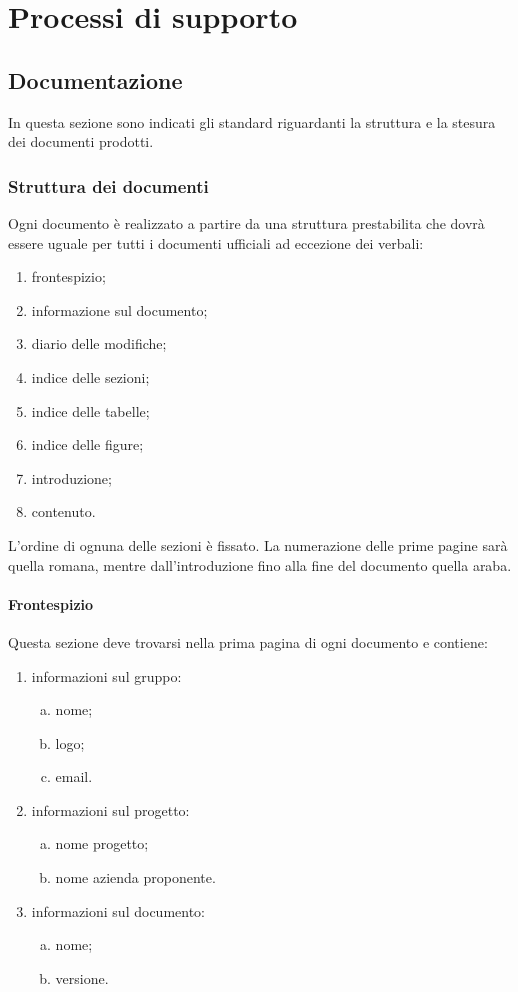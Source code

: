 \documentclass[../NormeProgetto.tex]{subfiles}
\begin{document}
\section{Processi di supporto}
\subsection{Documentazione}
In questa sezione sono indicati gli standard riguardanti la struttura e la stesura dei documenti prodotti.
	\subsubsection{Struttura dei documenti}
		Ogni documento è realizzato a partire da una struttura prestabilita che dovrà essere uguale per tutti i documenti ufficiali ad eccezione dei verbali:
		\begin{enumerate}
			\item frontespizio;
			\item informazione sul documento;
			\item diario delle modifiche;
			\item indice delle sezioni;
			\item indice delle tabelle;
			\item indice delle figure;
			\item introduzione;
			\item contenuto.
		\end{enumerate}
		L'ordine di ognuna delle sezioni è fissato. La numerazione delle prime pagine sarà quella romana, mentre dall'introduzione fino alla fine del documento quella araba.

		\paragraph{Frontespizio}
			Questa sezione deve trovarsi nella prima pagina di ogni documento e contiene:
			\begin{enumerate}
				\item informazioni sul gruppo:
					\begin{enumerate}[a.]
						\item nome;
						\item logo;
						\item email.
					\end{enumerate}
				\item informazioni sul progetto:
					\begin{enumerate}[a.]
						\item nome progetto;
						\item nome azienda proponente.
					\end{enumerate}
				\item informazioni sul documento:
					\begin{enumerate}[a.]
						\item nome;
						\item versione.
					\end{enumerate}
			\end{enumerate}
\end{document}
